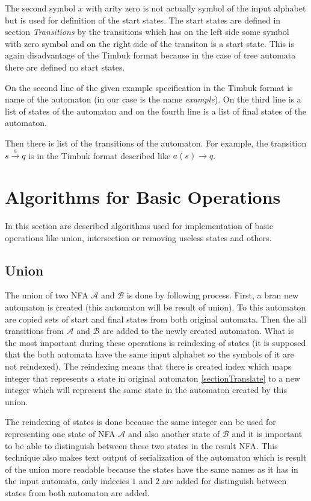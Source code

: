 The second symbol $x$ with arity zero is not actually symbol of the input alphabet but is used for definition of the start states. The
start states are defined in section \emph{Transitions} by the transitions which has on the left side some symbol with zero symbol and on the
right side of the transiton is a start state. This is again disadvantage
of the Timbuk format because in the case of tree automata there are defined no start states.

On the second line of the given example specification in the Timbuk format is name of the automaton (in our case is the name \emph{example}). 
On the third line is a list of states of the automaton and on the fourth line is a list of final states of the automaton.

Then there is list of the transitions of the automaton. 
For example, the transition $s \xrightarrow{a} q$ is in the Timbuk format described like $a(s)\rightarrow q$.

\section{Algorithms for Basic Operations}
In this section are described algorithms used for implementation of basic operations like union, intersection or removing useless states and others. 
\subsection{Union}
The union of two NFA $\mathcal{A}$ and $\mathcal{B}$ is done by following process. First, a bran new automaton is created (this automaton
will be result of union). To this automaton are copied sets of start and final states from both original automata. Then the all transitions from $\mathcal{A}$ and
$\mathcal{B}$ are added to the newly created automaton. What is the most important during these operations is reindexing of states (it is supposed
that the both automata have the same input alphabet so the symbols of it are not reindexed). The reindexing means that there is created index which maps
integer that represents a state in original automaton \ref{sectionTranslate} 
to a new integer which will represent the same state in the automaton created by this union.

The reindexing of states is done because the same integer can be used for representing one state of NFA $\mathcal{A}$ 
and also another state of $\mathcal{B}$ and it is important
to be able to distinguish between these two states in the result NFA. This technique also makes text output of serialization of the automaton which is result of 
the union more readable because the states have the same names as it has in the input automata, only indecies $1$ and $2$ are added for 
distinguish between states from both automaton are added.

